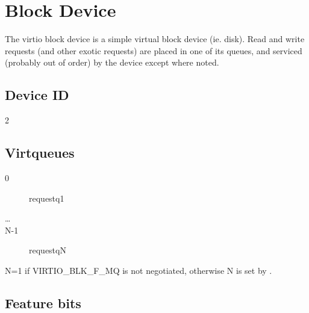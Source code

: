 \section{Block Device}\label{sec:Device Types / Block Device}

The virtio block device is a simple virtual block device (ie.
disk). Read and write requests (and other exotic requests) are
placed in one of its queues, and serviced (probably out of order) by the
device except where noted.

\subsection{Device ID}\label{sec:Device Types / Block Device / Device ID}
  2

\subsection{Virtqueues}\label{sec:Device Types / Block Device / Virtqueues}
\begin{description}
\item[0] requestq1
\item[\ldots]
\item[N-1] requestqN
\end{description}

 N=1 if VIRTIO_BLK_F_MQ is not negotiated, otherwise N is set by
 .

\subsection{Feature bits}\label{sec:Device Types / Block Device / Feature bits}

